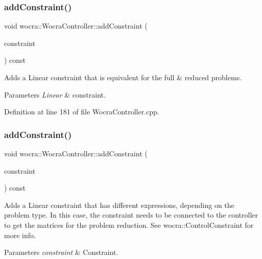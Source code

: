 \subsubsection{\texorpdfstring{add\+Constraint()}{addConstraint()}\hspace{0.1cm}{\footnotesize\ttfamily [1/2]}}
{\footnotesize\ttfamily void wocra\+::\+Wocra\+Controller\+::add\+Constraint (\begin{DoxyParamCaption}\item[{\hyperlink{namespaceocra_ae8b87cf4099be3efc3b410019ad2046e}{ocra\+::\+Linear\+Constraint} \&}]{constraint }\end{DoxyParamCaption}) const}

Adds a Linear constraint that is equivalent for the full \& reduced problems.


\begin{DoxyParams}{Parameters}
{\em Linear} & constraint. \\
\hline
\end{DoxyParams}


Definition at line 181 of file Wocra\+Controller.\+cpp.

\hypertarget{classwocra_1_1WocraController_af6db65f470668d19bb7fd24821f042db}{}\label{classwocra_1_1WocraController_af6db65f470668d19bb7fd24821f042db} 
\subsubsection{\texorpdfstring{add\+Constraint()}{addConstraint()}\hspace{0.1cm}{\footnotesize\ttfamily [2/2]}}
{\footnotesize\ttfamily void wocra\+::\+Wocra\+Controller\+::add\+Constraint (\begin{DoxyParamCaption}\item[{\hyperlink{classocra_1_1ControlConstraint}{ocra\+::\+Control\+Constraint} \&}]{constraint }\end{DoxyParamCaption}) const}

Adds a Linear constraint that has different expressions, depending on the problem type. In this case, the constraint needs to be connected to the controller to get the matrices for the problem reduction. See wocra\+::\+Control\+Constraint for more info.


\begin{DoxyParams}{Parameters}
{\em constraint} & Constraint. \\
\hline
\end{DoxyParams}


